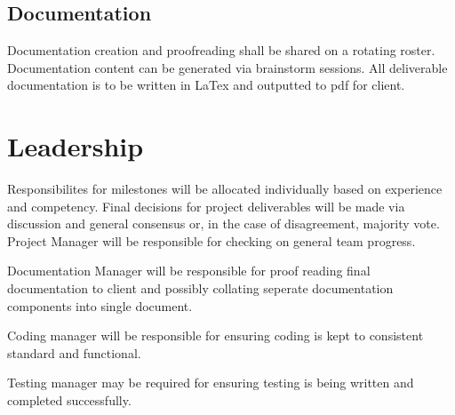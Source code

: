 \documentclass[11pt, letterpaper]{article}
\begin{document}
\subsection{Documentation}
Documentation creation and proofreading shall be shared on a rotating roster.
Documentation content can be generated via brainstorm sessions.
All deliverable documentation is to be written in LaTex and outputted to pdf for client.

\section{Leadership}
Responsibilites for milestones will be allocated individually based on experience and competency.
Final decisions for project deliverables will be made via discussion and general consensus or, in 
the case of disagreement, majority vote.
Project Manager will be responsible for checking on general team progress.\par
Documentation Manager will be responsible for proof reading final documentation to client and possibly
collating seperate documentation components into single document.\par
Coding manager will be responsible for ensuring coding is kept to consistent standard and functional.\par
Testing manager may be required for ensuring testing is being written and completed successfully.
\end{document}
